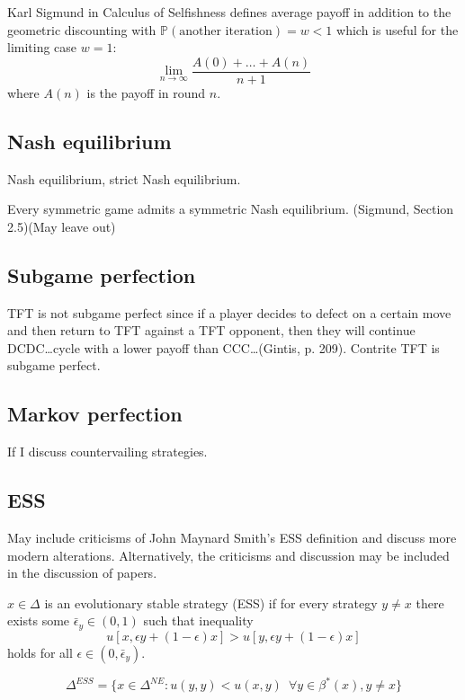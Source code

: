 Karl Sigmund in Calculus of Selfishness defines average payoff in addition to the geometric discounting with
$
\mathbb{P}(\mbox{another iteration}) = w < 1
$
which is useful for the limiting case $w=1$:
\[
\lim_{n \rightarrow \infty} \frac{A(0) + \dots + A(n)}{n+1}
\]
where $A(n)$ is the payoff in round $n$.
\subsection{Nash equilibrium}
\begin{definition}
Nash equilibrium, strict Nash equilibrium.
\end{definition}

\begin{theorem}
Every symmetric game admits a symmetric Nash equilibrium. (Sigmund, Section 2.5)(May leave out)
\end{theorem}
\subsection{Subgame perfection}

TFT is not subgame perfect since if a player decides to defect on a certain move and then return to TFT against a TFT opponent, then they will continue DCDC\dots cycle with a lower payoff than CCC\dots (Gintis, p. 209). Contrite TFT is subgame perfect.

\subsection{Markov perfection}
If I discuss countervailing strategies. 
 
\subsection{ESS}
May include criticisms of John Maynard Smith's ESS definition and discuss more modern alterations. Alternatively, the criticisms and discussion may be included in the discussion of papers.
\begin{definition}$x \in \Delta$ is an evolutionary stable strategy (ESS) if for every strategy $y \neq x$ there exists some $\bar{\epsilon}_y \in (0, 1)$ such that inequality
\[
u[x, \epsilon y + (1-\epsilon) x ] > u [ y, \epsilon y + (1- \epsilon) x]
\]
holds for all $\epsilon \in (0, \bar{\epsilon}_y)$.
\end{definition}
\begin{proposition}
\[
\Delta^{ESS} = \{ x \in \Delta^{NE} : u(y, y) < u(x, y) \enspace \forall y \in \beta^* (x), y \neq x \}
\]
\end{proposition}


